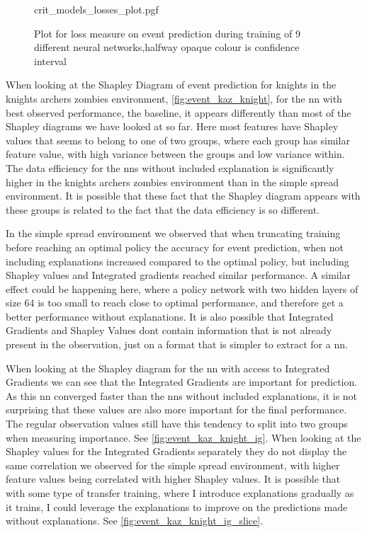 \documentclass[UKenglish]{uiomasterthesis}
\begin{document}
\begin{figure}[hbtp]
\centering
{crit_models_losses_plot.pgf}
\caption{Plot for loss measure on event prediction during training of 9 different neural networks,halfway opaque colour is confidence interval}
\label{fig:event_knight_losses}
\end{figure}

When looking at the Shapley Diagram of event prediction for knights in the knights archers zombies environment, \cref{fig:event_kaz_knight}, for the \ac{nn} with best observed performance, the baseline, it appears differently than most of the Shapley diagrams we have looked at so far. Here most features have Shapley values that seems to belong to one of two groups, where each group has similar feature value, with high variance between the groups and low variance within. The data efficiency for the \acp{nn} without included explanation is significantly higher in the knights archers zombies environment than in the simple spread environment. It is possible that these fact that the Shapley diagram appears with these groups is related to the fact that the data efficiency is so different.

In the simple spread environment we observed that when truncating training before reaching an optimal policy the accuracy for event prediction, when not including explanations increased compared to the optimal policy, but including Shapley values and Integrated gradients reached similar performance. A similar effect could be happening here, where a policy network with two hidden layers of size 64 is too small to reach close to optimal performance, and therefore get a better performance without explanations. It is also possible that Integrated Gradients and Shapley Values dont contain information that is not already present in the observation, just on a format that is simpler to extract for a \ac{nn}.

When looking at the Shapley diagram for the \ac{nn} with access to Integrated Gradients we can see that the Integrated Gradients are important for prediction. As this \ac{nn} converged faster than the \acp{nn} without included explanations, it is not surprising that these values are also more important for the final performance. The regular observation values still have this tendency to split into two groups when measuring importance. See \cref{fig:event_kaz_knight_ig}. When looking at the Shapley values for the Integrated Gradients separately they do not display the same correlation we observed for the simple spread environment, with higher feature values being correlated with higher Shapley values. It is possible that with some type of transfer training, where I introduce explanations gradually as it trains, I could leverage the explanations to improve on the predictions made without explanations. See \cref{fig:event_kaz_knight_ig_slice}.
\end{document}
